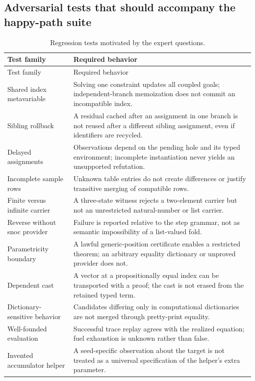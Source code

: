 \documentclass[11pt,a4paper]{article}
\theoremstyle{definition}
\theoremstyle{remark}
\begin{document}
\subsection{Adversarial tests that should accompany the happy-path suite}
\begin{longtable}{@{}L{41mm}L{101mm}@{}}
\caption{Regression tests motivated by the expert questions.}\label{tab:regression}\\
\toprule Test family & Required behavior\\\midrule
\endfirsthead
\toprule Test family & Required behavior\\\midrule
\endhead
Shared index metavariable & Solving one constraint updates all coupled goals; independent-branch memoization does not commit an incompatible index.\\
Sibling rollback & A residual cached after an assignment in one branch is not reused after a different sibling assignment, even if identifiers are recycled.\\
Delayed assignments & Observations depend on the pending hole and its typed environment; incomplete instantiation never yields an unsupported refutation.\\
Incomplete sample rows & Unknown table entries do not create differences or justify transitive merging of compatible rows.\\
Finite versus infinite carrier & A three-state witness rejects a two-element carrier but not an unrestricted natural-number or list carrier.\\
Reverse without snoc provider & Failure is reported relative to the step grammar, not as semantic impossibility of a list-valued fold.\\
Parametricity boundary & A lawful generic-position certificate enables a restricted theorem; an arbitrary equality dictionary or unproved provider does not.\\
Dependent cast & A vector at a propositionally equal index can be transported with a proof; the cast is not erased from the retained typed term.\\
Dictionary-sensitive behavior & Candidates differing only in computational dictionaries are not merged through pretty-print equality.\\
Well-founded evaluation & Successful trace replay agrees with the realized equation; fuel exhaustion is unknown rather than false.\\
Invented accumulator helper & A seed-specific observation about the target is not treated as a universal specification of the helper's extra parameter.\\

\end{longtable}
\end{document}
